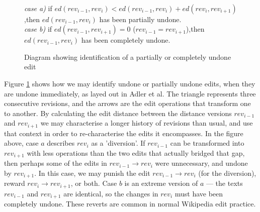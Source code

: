 \begin{figure}[h]
  \centering
  \\ 
  \vspace{5mm}
  \textit{case a)} if $ed(rev_{i-1},rev_i) < ed(rev_{i-1},rev_i) +
  ed(rev_{i},rev_{i+1})$,\newline then $ed(rev_{i-1},rev_i)$ has been
  partially undone.\\
  \vspace{5mm}
  \textit{case b)} if $ed(rev_{i-1},rev_{i+1}) = 0$
  ($rev_{i-1} = rev_{i+1}$),\newline then $ed(rev_{i-1},rev_i)$ has been
  completely undone.
  \caption{Diagram showing identification of a partially or
    completely undone edit}
  \label{fig:undo}
\end{figure}

Figure \ref{fig:undo} shows how we may identify undone or partially
undone edits, when they are undone immediately, as layed out in Adler
et al.\cite{Adler2007} The triangle represents three consecutive
revisions, and the arrows are the edit operations that transform one
to another. By calculating the edit distance between the distance
versions $rev_{i-1}$ and $rev_{i+1}$ we may characterise a longer history
of revisions than usual, and use that context in order to
re-characterise the edits it encompasses. In the figure above, case
$a$ describes $rev_i$ as a 'diversion'. If $rev_{i-1}$ can be transformed
into $rev_{i+1}$ with less operations than the two edits that actually
bridged that gap, then perhaps some of the edits in $rev_{i-1}
\rightarrow rev_i$ were unnecessary, and undone by $rev_{i+1}$. In this
case, we may punish the edit $rev_{i-1} \rightarrow rev_i$ (for the
diversion), reward $rev_{i} \rightarrow rev_{i+1}$, or both. Case $b$ is
an extreme version of $a$ --- the texts $rev_{i-1}$ and $rev_{i+1}$ are
identical, so the changes in $rev_i$ must have been completely
undone. These reverts are common in normal Wikipedia edit
practice.\cite{wiki-revert}

